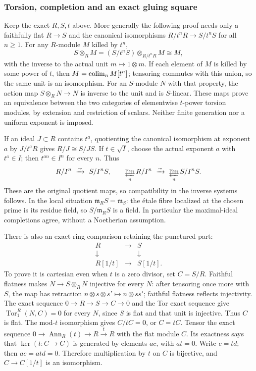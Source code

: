 \subsubsection{Torsion, completion and an exact gluing square}\label{torsion-completion-and-an-exact-gluing-square}

Keep the exact \(R,S,t\) above. More generally the following proof needs only a faithfully flat \(R\to S\) and the canonical isomorphisms \(R/t^nR\to S/t^nS\) for all \(n\geq1\). For any \(R\)-module \(M\) killed by \(t^n\), \[
S\otimes_R M=(S/t^nS)\otimes_{R/t^nR}M\cong M,
\] with the inverse to the actual unit \(m\mapsto1\otimes m\). If each element of \(M\) is killed by some power of \(t\), then \(M=\mathop{\rm colim}_n M[t^n]\); tensoring commutes with this union, so the same unit is an isomorphism. For an \(S\)-module \(N\) with that property, the action map \(S\otimes_R N\to N\) is inverse to the unit and is \(S\)-linear. These maps prove an equivalence between the two categories of elementwise \(t\)-power torsion modules, by extension and restriction of scalars. Neither finite generation nor a uniform exponent is imposed.

If an ideal \(J\subset R\) contains \(t^a\), quotienting the canonical isomorphism at exponent \(a\) by \(J/t^aR\) gives \(R/J\cong S/JS\). If \(t\in\sqrt I\), choose the actual exponent \(a\) with \(t^a\in I\); then \(t^{an}\in I^n\) for every \(n\). Thus \[
R/I^n\ \xrightarrow{\sim}\ S/I^nS,\qquad
\varprojlim_n R/I^n\ \xrightarrow{\sim}\ \varprojlim_n S/I^nS.
\] These are the original quotient maps, so compatibility in the inverse systems follows. In the local situation \(\mathfrak m_RS=\mathfrak m_S\): the étale fibre localized at the chosen prime is its residue field, so \(S/\mathfrak m_RS\) is a field. In particular the maximal-ideal completions agree, without a Noetherian assumption.

There is also an exact ring comparison retaining the punctured part: \[
\begin{matrix}
R&\longrightarrow&S\\
\downarrow&&\downarrow\\
R[1/t]&\longrightarrow&S[1/t].
\end{matrix}
\tag{LI-1}
\] To prove it is cartesian even when \(t\) is a zero divisor, set \(C=S/R\). Faithful flatness makes \(N\to S\otimes_R N\) injective for every \(N\): after tensoring once more with \(S\), the map has retraction \(n\otimes s\otimes s'\mapsto n\otimes ss'\); faithful flatness reflects injectivity. The exact sequence \(0\to R\to S\to C\to0\) and the Tor exact sequence give \(\operatorname{Tor}_1^R(N,C)=0\) for every \(N\), since \(S\) is flat and that unit is injective. Thus \(C\) is flat. The mod-\(t\) isomorphism gives \(C/tC=0\), or \(C=tC\). Tensor the exact sequence \(0\to\operatorname{Ann}_R(t)\to R\xrightarrow{t}R\) with the flat module \(C\). Its exactness says that \(\ker(t:C\to C)\) is generated by elements \(ac\), with \(at=0\). Write \(c=td\); then \(ac=atd=0\). Therefore multiplication by \(t\) on \(C\) is bijective, and \(C\to C[1/t]\) is an isomorphism.

